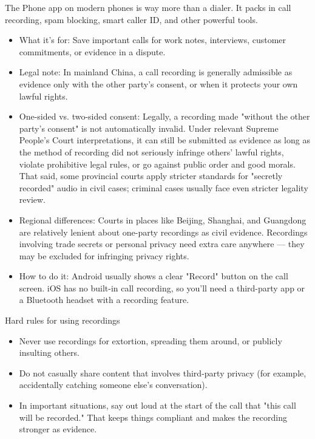 


The Phone app on modern phones is way more than a dialer. It packs in call recording, spam blocking, smart caller ID, and other powerful tools.


\begin{itemize}
  \item What it's for: Save important calls for work notes, interviews, customer commitments, or evidence in a dispute.
  \item Legal note: In mainland China, a call recording is generally admissible as evidence only with the other party's consent, or when it protects your own lawful rights.
  \item One-sided vs. two-sided consent: Legally, a recording made "without the other party's consent" is not automatically invalid. Under relevant Supreme People's Court interpretations, it can still be submitted as evidence as long as the method of recording did not seriously infringe others' lawful rights, violate prohibitive legal rules, or go against public order and good morals. That said, some provincial courts apply stricter standards for "secretly recorded" audio in civil cases; criminal cases usually face even stricter legality review.
  \item Regional differences: Courts in places like Beijing, Shanghai, and Guangdong are relatively lenient about one-party recordings as civil evidence. Recordings involving trade secrets or personal privacy need extra care anywhere — they may be excluded for infringing privacy rights.
  \item How to do it: Android usually shows a clear "Record" button on the call screen. iOS has no built-in call recording, so you'll need a third-party app or a Bluetooth headset with a recording feature.
\end{itemize}

\begin{tcbwarn}{Hard rules for using recordings}
\begin{itemize}
  \item Never use recordings for extortion, spreading them around, or publicly insulting others.
  \item Do not casually share content that involves third-party privacy (for example, accidentally catching someone else's conversation).
  \item In important situations, say out loud at the start of the call that "this call will be recorded." That keeps things compliant and makes the recording stronger as evidence.
\end{itemize}

\end{tcbwarn}

